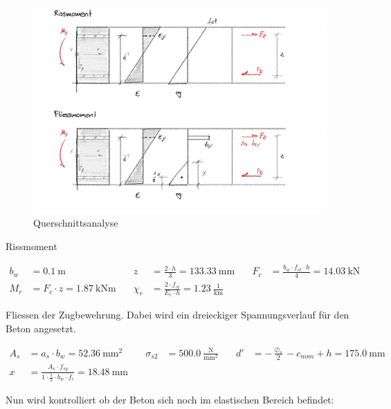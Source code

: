 \documentclass[
  11pt,
  letterpaper,
]{scrreprt}
\begin{document}
\begin{figure}[H]

{\centering \includegraphics{../imgs/thesis_skizzen-2.jpg}

}

\caption{Querschnittsanalyse}

\end{figure}%

Rissmoment

\[
\begin{aligned}
b_{w}& = 0.1 \ \mathrm{m} \quad & z& = \frac{2 \cdot h}{3} = 133.33 \ \mathrm{mm} \quad & F_{c}& = \frac{b_{w} \cdot f_{ct} \cdot h}{4} = 14.03 \ \mathrm{kN} \\ 
M_{r}& = F_{c} \cdot z = 1.87 \ \mathrm{kNm} \quad & \chi_{r}& = \frac{2 \cdot f_{ct}}{E_{c} \cdot h} = 1.23 \ \frac{1}{\mathrm{km}} \quad &  
 \end{aligned}
\]

Fliessen der Zugbewehrung. Dabei wird ein dreieckiger Spannungsverlauf
für den Beton angesetzt.

\[
\begin{aligned}
A_{s}& = a_{s} \cdot b_{w} = 52.36 \ \mathrm{mm}^{2} \quad & \sigma_{s 2}& = 500.0 \ \frac{\mathrm{N}}{\mathrm{mm}^{2}} \quad & {d}'& = - \frac{\oslash_{s}}{2} - c_{nom} + h = 175.0 \ \mathrm{mm} \\ 
x& = \frac{A_{s} \cdot f_{sy}}{1 \cdot \frac{1}{2} \cdot b_{w} \cdot f_{c}} = 18.48 \ \mathrm{mm} \quad &  \quad &  
 \end{aligned}
\]

Nun wird kontrolliert ob der Beton sich noch im elastischen Bereich
befindet:
\end{document}
